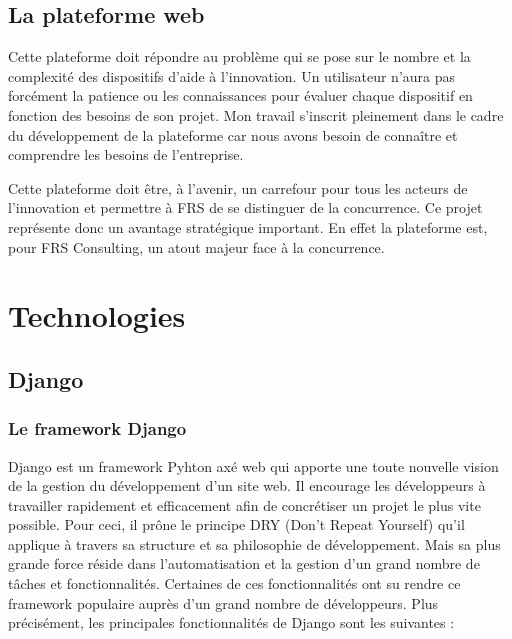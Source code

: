 \documentclass[french]{article}
\begin{document}
{\subsection{La plateforme web}

Cette plateforme doit répondre au problème qui se pose sur le nombre et la complexité des dispositifs d'aide à l'innovation. Un utilisateur n'aura pas forcément la patience ou les connaissances pour évaluer chaque dispositif en fonction des besoins de son projet.
\newline{}
Mon travail s'inscrit pleinement dans le cadre du développement de la plateforme car nous avons besoin de connaître et comprendre les besoins de l'entreprise.

Cette plateforme doit être, à l'avenir, un carrefour pour tous les acteurs de l'innovation et permettre à FRS de se distinguer de la concurrence. Ce projet représente donc un avantage stratégique important. En effet la plateforme est, pour FRS Consulting, un atout majeur face à la concurrence.

\section{Technologies}

\subsection{Django}

\subsubsection{Le framework Django}

Django \cite{django} est un framework Pyhton axé web qui apporte une toute nouvelle vision de la gestion du développement d'un site web. Il encourage les développeurs à travailler rapidement et efficacement afin de concrétiser un projet le plus vite possible. Pour ceci, il prône le principe DRY (Don't Repeat Yourself) qu'il applique à travers sa structure et sa philosophie de développement. Mais sa plus grande force réside dans l'automatisation et la gestion d'un grand nombre de tâches et fonctionnalités. Certaines de ces fonctionnalités ont su rendre ce framework populaire auprès d'un grand nombre de développeurs. Plus précisément, les principales fonctionnalités de Django sont les suivantes :

}
\end{document}
